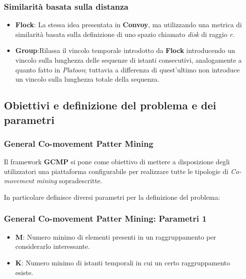 \documentclass{beamer}
\begin{document}
\begin{frame}

\frametitle{Similarità basata sulla distanza}

\begin{itemize}

\item \textbf{Flock}: La stessa idea presentata in \textbf{Convoy}, ma utilizzando una metrica di similarità basata sulla definizione
di uno spazio chiamato \textit{disk} di raggio \textit{r}.


\item \textbf{Group}:Rilassa il vincolo temporale introdotto da \textbf{Flock} introducendo un vincolo sulla lunghezza delle sequenze di istanti consecutivi, analogamente a quanto fatto in \textit{Platoon}; tuttavia a differenza di quest'ultimo non introduce un vincolo sulla lunghezza totale della sequenza.


\end{itemize}

\end{frame}






\subsection{Obiettivi e definizione del problema e dei parametri}

\begin{frame}
\frametitle{General Co-movement Patter Mining}
Il framework \textbf{GCMP} si pone come obiettivo di mettere a disposizione degli utilizzatori una piattaforma configurabile per realizzare tutte le tipologie di \textit{Co-movement mining} sopradescritte.

In particolare definisce diversi parametri per la definizione del problema:
\end{frame}

\begin{frame}
\frametitle{General Co-movement Patter Mining: Parametri 1}

\begin{itemize}

\item \textbf{M}: Numero minimo di elementi presenti in un raggruppamento per considerarlo interessante.
\item \textbf{K}: Numero minimo di istanti temporali in cui un certo raggruppamento esiste.

\end{itemize}

\end{frame}
\end{document}
